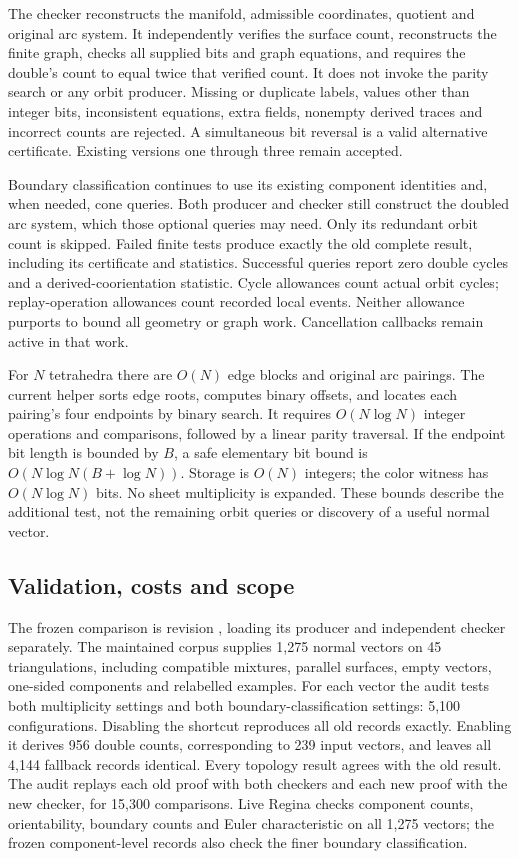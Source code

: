 The checker reconstructs the manifold, admissible coordinates, quotient
and original arc system. It independently verifies the surface count,
reconstructs the finite graph, checks all supplied bits and graph equations,
and requires the double's count to equal twice that verified count. It
does not invoke the parity search or any orbit producer. Missing or
duplicate labels, values other than integer bits, inconsistent equations, extra fields,
nonempty derived traces and incorrect counts are rejected. A simultaneous
bit reversal is a valid alternative certificate. Existing versions one
through three remain accepted.

Boundary classification continues to use its existing component identities
and, when needed, cone queries. Both producer and checker still construct
the doubled arc system, which those optional queries may need. Only its
redundant orbit count is skipped. Failed finite tests produce exactly the
old complete result, including its certificate and statistics. Successful
queries report zero double cycles and a derived-coorientation statistic.
Cycle allowances count actual orbit cycles; replay-operation allowances
count recorded local events. Neither allowance purports to bound all
geometry or graph work. Cancellation callbacks remain active in that work.

For $N$ tetrahedra there are $O(N)$ edge blocks and original arc pairings.
The current helper sorts edge roots, computes binary offsets, and locates
each pairing's four endpoints by binary search. It requires
$O(N\log N)$ integer operations and comparisons, followed by a linear
parity traversal. If the endpoint bit length is bounded by $B$, a safe
elementary bit bound is $O(N\log N(B+\log N))$. Storage is $O(N)$ integers;
the color witness has $O(N\log N)$ bits. No sheet multiplicity is expanded.
These bounds describe the additional test, not the remaining orbit
queries or discovery of a useful normal vector.

\subsection{Validation, costs and scope}

The frozen comparison is revision , loading its producer
and independent checker separately. The maintained corpus supplies 1,275
normal vectors on 45 triangulations, including compatible mixtures,
parallel surfaces, empty vectors, one-sided components and relabelled
examples. For each vector the audit tests both multiplicity settings and
both boundary-classification settings: 5,100 configurations. Disabling
the shortcut reproduces all old records exactly. Enabling it derives 956
double counts, corresponding to 239 input vectors, and leaves all 4,144
fallback records identical. Every topology result agrees with the old
result. The audit replays each old proof with both checkers and each new
proof with the new checker, for 15,300 comparisons. Live Regina checks
component counts, orientability, boundary counts and Euler characteristic
on all 1,275 vectors; the frozen component-level records also check the
finer boundary classification.

